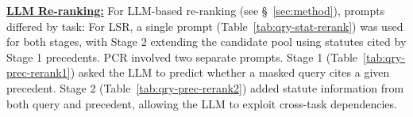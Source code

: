\vspace{1mm}
\noindent \underline{\bf LLM Re-ranking:} For LLM-based re-ranking (see \S~\ref{sec:method}), prompts differed by task:  
For LSR, a single prompt (Table~\ref{tab:qry-stat-rerank}) was used for both stages, with Stage 2 extending the candidate pool using statutes cited by Stage 1 precedents.  
PCR involved two separate prompts. Stage 1 (Table~\ref{tab:qry-prec-rerank1}) asked the LLM to predict whether a masked query cites a given precedent. Stage 2 (Table~\ref{tab:qry-prec-rerank2}) added statute information from both query and precedent, allowing the LLM to exploit cross-task dependencies.  














